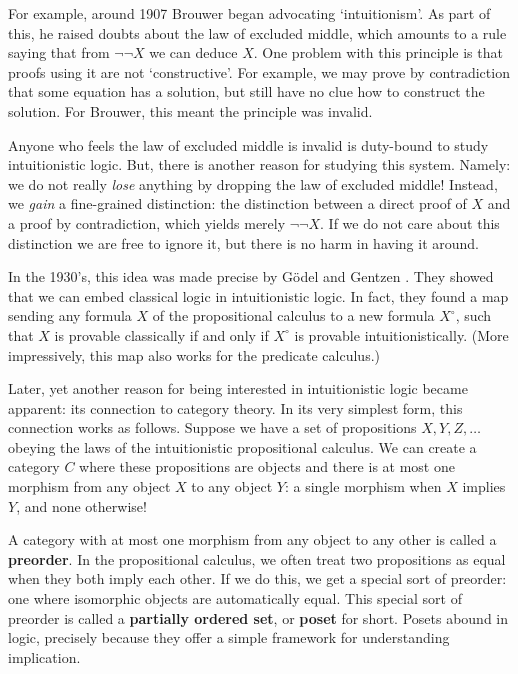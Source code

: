 \documentclass[12pt,twoside,openright]{report}
\begin{document}
For example, around 1907 Brouwer \cite{Heyting} began advocating
`intuitionism'.  As part of this, he raised doubts about the law of excluded middle, which amounts to a rule saying that from $\neg \neg X$ 
we can deduce $X$.  One problem with this principle is that proofs using it are not `constructive'.   For example, we may prove by contradiction that some equation has a solution, but still have no clue how to construct the solution.   For Brouwer, this meant the principle was invalid.

Anyone who feels the law of excluded middle is invalid is duty-bound to study intuitionistic logic.  But, there is another reason for studying this system.  Namely: we do not really {\it lose} anything by dropping the law of excluded middle!  Instead, we {\em gain} a fine-grained distinction: the distinction between a direct proof of $X$ and a proof by contradiction, which yields merely $\neg \neg X$. If we do not care about this distinction we are free to ignore it, but there is no harm in having it around.  

In the 1930's, this idea was made precise by G\"odel \cite{Goedel} and Gentzen \cite{Gentzen}.  They showed that we can embed classical logic in intuitionistic logic.  In fact, they found a map sending any formula $X$ of the propositional calculus to a new formula $X^\circ$, such that $X$ is provable classically if and only if $X^\circ$ is provable intuitionistically.  (More impressively, this map also works for the predicate calculus.)

Later, yet another reason for being interested in intuitionistic logic became apparent: its connection to category theory.  In its very simplest form, this connection works as follows.  Suppose we have a set of propositions $X, Y, Z, \dots$ obeying the laws of the intuitionistic propositional calculus.  We can create a category
$C$ where these propositions are objects and there is at most one morphism from any object $X$ to any object $Y$: a single morphism when $X$ implies $Y$, and none otherwise!  

A category with at most one morphism from any object to any other is called a {\bf preorder}.  In the propositional calculus, we often treat two propositions as equal when they both imply each other. If we do this, we get a special sort of preorder: one where isomorphic objects are automatically equal.  This special sort of preorder is called a {\bf partially ordered set}, or {\bf poset}
for short.  Posets abound in logic, precisely because they offer a simple framework for understanding implication.  
\end{document}
